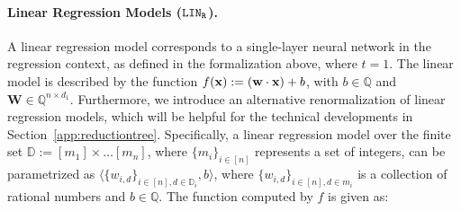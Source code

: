 








\paragraph{Linear Regression Models ($\texttt{\text{LIN}}_{\texttt{\text{R}}}$).} 
A linear regression model corresponds to a single-layer neural network in the regression context, as defined in the formalization above, where $t=1$. The linear model is described by the function $f(\textbf{x}) := (\mathbf{w} \cdot \textbf{x}) + b$, with $b \in \mathbb{Q}$ and $\mathbf{W} \in \mathbb{Q}^{n \times d_1}$. Furthermore, we introduce an alternative renormalization of linear regression models, which will be helpful for the technical developments in Section~\ref{app:reductiontree}. Specifically, a linear regression model over the finite set $\mathbb{D} := [m_{1}] \times \ldots [m_{n}]$, where $\{m_{i}\}_{i \in [n]}$ represents a set of integers, can be parametrized as $\langle \{w_{i,d}\}_{i \in [n], d \in \mathbb{D}_{i}}, b\rangle$, where $\{w_{i,d}\}_{i \in [n], d \in m_{i}}$ is a collection of rational numbers and $b \in \mathbb{Q}$. The function computed by $f$ is given as:



